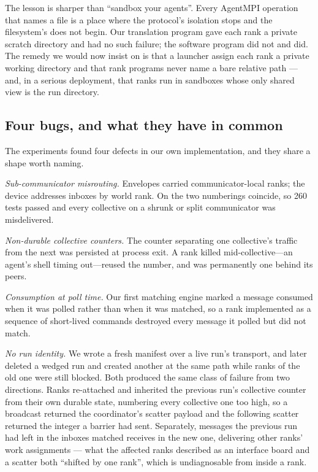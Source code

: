 The lesson is sharper than ``sandbox your agents''. Every AgentMPI operation
that names a file is a place where the protocol's isolation stops and the
filesystem's does not begin. Our translation program gave each rank a
private scratch directory and had no such failure; the software program did
not and did. The remedy we would now insist on is that a launcher assign
each rank a private working directory and that rank programs never name a
bare relative path --- and, in a serious deployment, that ranks run in
sandboxes whose only shared view is the run directory.

\subsection{Four bugs, and what they have in common}
\label{sec:discussion-bugs}

The experiments found four defects in our own implementation, and they
share a shape worth naming.

\emph{Sub-communicator misrouting.} Envelopes carried communicator-local
ranks; the device addresses inboxes by world rank. On  the
two numberings coincide, so 260 tests passed and every collective on a
shrunk or split communicator was misdelivered.

\emph{Non-durable collective counters.} The counter separating one
collective's traffic from the next was persisted at process exit. A rank
killed mid-collective---an agent's shell timing out---reused the number, and
was permanently one behind its peers.

\emph{Consumption at poll time.} Our first matching engine marked a message
consumed when it was polled rather than when it was matched, so a rank
implemented as a sequence of short-lived commands destroyed every message it
polled but did not match.

\emph{No run identity.} We wrote a fresh manifest over a live run's
transport, and later deleted a wedged run and created another at the same
path while ranks of the old one were still blocked. Both produced the same
class of failure from two directions. Ranks re-attached and inherited the
previous run's collective counter from their own durable state, numbering
every collective one too high, so a broadcast returned the coordinator's
scatter payload and the following scatter returned the integer a barrier had
sent. Separately, messages the previous run had left in the inboxes matched
receives in the new one, delivering other ranks' work assignments --- what
the affected ranks described as an interface board and a scatter both
``shifted by one rank'', which is undiagnosable from inside a rank.

